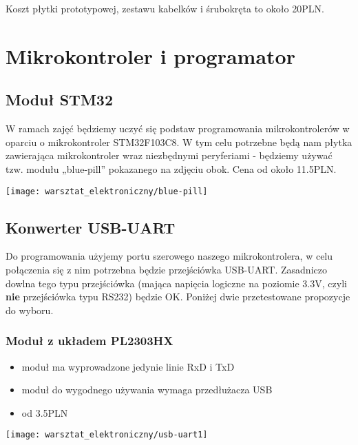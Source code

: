 \documentclass{pdfBooklets}
\newcommand\wada{\item[\textbf{\ttfamily -}]}
\newcommand\info{\item[\textbf{\ttfamily *}]}
\begin{document}
	Koszt płytki prototypowej, zestawu kabelków i śrubokręta to około 20PLN.

\section{Mikrokontroler i programator}

\subsection{Moduł STM32}
	\parbox[c]{0.55\textwidth}{
		W ramach zajęć będziemy uczyć się podstaw programowania mikrokontrolerów w oparciu o mikrokontroler STM32F103C8.
		W tym celu potrzebne będą nam płytka zawierająca mikrokontroler wraz niezbędnymi peryferiami - będziemy używać tzw. modułu „blue-pill” pokazanego na zdjęciu obok. Cena od około 11.5PLN.
	}
	\parbox[c]{0.43\textwidth}{
		\begin{flushright} \texttt{[image: warsztat\_elektroniczny/blue-pill]} \end{flushright}
	}

\subsection{Konwerter USB-UART}
	Do programowania użyjemy portu szerowego naszego mikrokontrolera, w celu połączenia się z nim potrzebna będzie przejściówka USB-UART. Zasadniczo dowlna tego typu przejściówka (mająca napięcia logiczne na poziomie 3.3V, czyli \textbf{nie} przejściówka typu RS232) będzie OK. Poniżej dwie przetestowane propozycje do wyboru.
	
	\subsubsection{Moduł z układem PL2303HX}
	\parbox[c]{0.55\textwidth}{
		\begin{itemize}
			\wada moduł ma wyprowadzone jedynie linie RxD i TxD
			\wada moduł do wygodnego używania wymaga przedłużacza USB
			\info od 3.5PLN
		\end{itemize}
	}
	\parbox[c]{0.43\textwidth}{
		\begin{flushright} \texttt{[image: warsztat\_elektroniczny/usb-uart1]} \end{flushright}
	}
	
\end{document}
